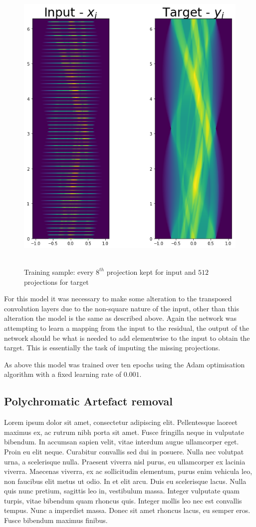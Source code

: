 \begin{figure}[htb]
\centering
     \includegraphics[width=0.7 \textwidth]{figures/trainingsamples7} \
  \caption{Training sample: every $8^{th}$ projection kept for input and $512$ projections for target}
  \label{trainingsamples7}
\end{figure}

For this model it was necessary to make some alteration to the transposed convolution layers due to the non-square nature of the input, other than this alteration the model 
is the same as described above. Again the network was attempting to learn a mapping from the input to the residual, the output of the network should be what is needed to add elementwise
to the input to obtain the target. This is essentially the task of imputing the missing projections. 

As above this model was trained over ten epochs using the Adam optimisation algorithm with a fixed learning rate of $0.001$.

\subsection{Polychromatic Artefact removal}


Lorem ipsum dolor sit amet, consectetur adipiscing elit. Pellentesque laoreet maximus ex, ac rutrum nibh porta sit amet. Fusce fringilla neque in vulputate bibendum. In accumsan sapien velit, vitae interdum augue ullamcorper eget. Proin eu elit neque. Curabitur convallis sed dui in posuere. Nulla nec volutpat urna, a scelerisque nulla. Praesent viverra nisl purus, eu ullamcorper ex lacinia viverra. Maecenas viverra, ex ac sollicitudin elementum, purus enim vehicula leo, non faucibus elit metus ut odio. In et elit arcu. Duis eu scelerisque lacus. Nulla quis nunc pretium, sagittis leo in, vestibulum massa. Integer vulputate quam turpis, vitae bibendum quam rhoncus quis. Integer mollis leo nec est convallis tempus. Nunc a imperdiet massa. Donec sit amet rhoncus lacus, eu semper eros. Fusce bibendum maximus finibus.

